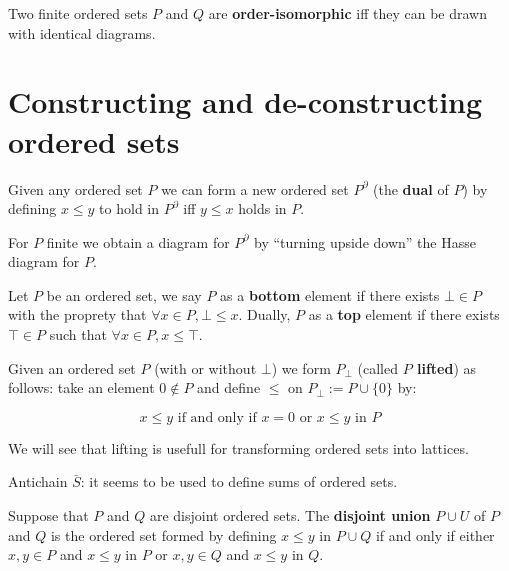 \begin{prop}
Two finite ordered sets $P$ and $Q$ are \textbf{order-isomorphic} iff they can be drawn with identical diagrams.
\end{prop}

\section{Constructing and de-constructing ordered sets}

\begin{definition}
Given any ordered set $P$ we can form a new ordered set $P^{\partial}$ (the \textbf{dual} of $P$) by defining $x \leq y$ to hold in $P^{\partial}$ iff $y \leq x$ holds in $P$.
\end{definition}

\begin{remark}
For $P$ finite we obtain a diagram for $P^{\partial}$ by ``turning upside down'' the Hasse diagram for $P$.
\end{remark}

\begin{definition}
	Let $P$ be an ordered set, we say $P$ as a \textbf{bottom} element if there exists $\bot \in P$ with the proprety that $\forall x \in P, \bot \leq x$. Dually, $P$ as a \textbf{top} element if there exists $\top \in P$ such that $\forall x \in P, x \leq \top$.
\end{definition}

\begin{definition}[lifting]
	Given an ordered set $P$ (with or without $\bot$) we form $P_{\bot}$ (called \textbf{$P$ lifted}) as follows: take an element $0 \not \in P$ and define $\leq$ on $P_{\bot} := P \cup\{0\}$ by:

	\begin{equation*}
		x \leq y \text{ if and only if } x = 0 \text{ or } x \leq y \text{ in } P
	\end{equation*}
\end{definition}

\begin{remark}
	We will see that lifting is usefull for transforming ordered sets into lattices.
\end{remark}

\begin{question}
	Antichain $\bar S$: it seems to be used to define sums of ordered sets.
\end{question}

\begin{definition}
  Suppose that $P$ and $Q$ are disjoint ordered sets. The \textbf{disjoint union} $P \cup U$ of $P$ and $Q$ is the ordered set formed by defining $x \leq y$ in $P \cup Q$ if and only if either $x, y \in P$ and $x \leq y$ in $P$ or $x,y \in Q$ and $x \leq y$ in $Q$.
\end{definition}

